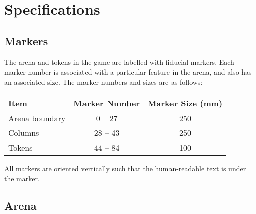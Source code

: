 \section{Specifications}
\label{sec:specs}

\subsection{Markers}
\label{spec:markers}

The arena and tokens in the game are labelled with fiducial
markers. Each marker number is associated with a particular feature in the
arena, and also has an associated size. The marker numbers and sizes are as
follows:

\begin{center}
\begin{tabular}{lcc}
  \toprule
  \textbf{Item} & \textbf{Marker Number} & \textbf{Marker Size (\si{mm})} \\
  \midrule
  Arena boundary & 0 -- 27 & 250 \\
  Columns & 28 -- 43 & 250 \\
  Tokens & 44 -- 84 & 100 \\
  \bottomrule
\end{tabular}
\end{center}

All markers are oriented vertically such that the human-readable text
is under the marker.

\subsection{Arena}
\label{spec:arena}

